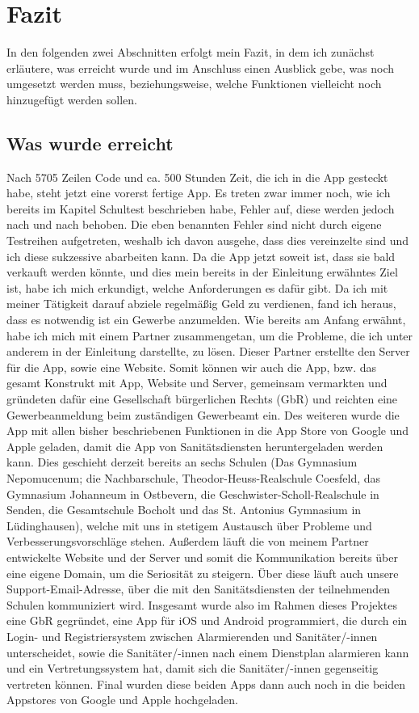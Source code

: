 \section{Fazit}
In den folgenden zwei Abschnitten erfolgt mein Fazit, in dem ich zunächst erläutere, was erreicht wurde und 
im Anschluss einen Ausblick gebe, was noch umgesetzt werden muss, beziehungsweise, welche Funktionen vielleicht noch hinzugefügt werden sollen.
\subsection{Was wurde erreicht}
    Nach 5705 Zeilen Code und ca. 500 Stunden Zeit, die ich in die App gesteckt habe, steht jetzt eine vorerst fertige App.
    Es treten zwar immer noch, wie ich bereits im Kapitel Schultest beschrieben habe, Fehler auf, diese werden
    jedoch nach und nach behoben. Die eben benannten Fehler sind nicht durch eigene Testreihen aufgetreten, weshalb
    ich davon ausgehe, dass dies vereinzelte sind und ich diese sukzessive abarbeiten kann. Da die App jetzt 
    soweit ist, dass sie bald verkauft werden könnte, und dies mein bereits in der Einleitung erwähntes Ziel ist,
    habe ich mich erkundigt, welche Anforderungen es dafür gibt. Da ich mit meiner Tätigkeit darauf abziele regelmäßig Geld
    zu verdienen, fand ich heraus, dass es notwendig ist ein Gewerbe anzumelden.
    Wie bereits am Anfang erwähnt, habe ich mich mit einem Partner zusammengetan, um die Probleme, die ich unter anderem 
    in der Einleitung darstellte, zu lösen. Dieser Partner erstellte den Server für die App, sowie eine Website.
    Somit können wir auch die App, bzw. das gesamt Konstrukt mit App, Website und Server, gemeinsam vermarkten und gründeten
    dafür eine Gesellschaft bürgerlichen Rechts (GbR) und reichten eine Gewerbeanmeldung beim zuständigen Gewerbeamt ein.
    Des weiteren wurde die App mit allen bisher beschriebenen Funktionen in die App Store von Google und Apple geladen, damit die App von Sanitätsdiensten 
    heruntergeladen werden kann. Dies geschieht derzeit bereits an sechs Schulen (Das Gymnasium Nepomucenum; die Nachbarschule, 
    Theodor-Heuss-Realschule Coesfeld, das Gymnasium Johanneum in Ostbevern, die Geschwister-Scholl-Realschule in Senden, 
    die Gesamtschule Bocholt und das St. Antonius Gymnasium in Lüdinghausen), welche mit uns in stetigem Austausch über Probleme und 
    Verbesserungsvorschläge stehen. Außerdem läuft die von meinem Partner entwickelte Website und der Server und somit die Kommunikation bereits über eine eigene Domain,
    um die Seriosität zu steigern. Über diese läuft auch unsere Support-Email-Adresse, über die mit den Sanitätsdiensten der teilnehmenden Schulen kommuniziert
    wird. Insgesamt wurde also im Rahmen dieses Projektes eine GbR gegründet, eine App für iOS und Android programmiert, die durch ein 
    Login- und Registriersystem zwischen Alarmierenden und Sanitäter/-innen unterscheidet, sowie
    die Sanitäter/-innen nach einem Dienstplan alarmieren kann und ein Vertretungssystem hat, damit sich die Sanitäter/-innen 
    gegenseitig vertreten können. Final wurden diese beiden Apps dann auch noch in die beiden Appstores von Google und Apple hochgeladen.
